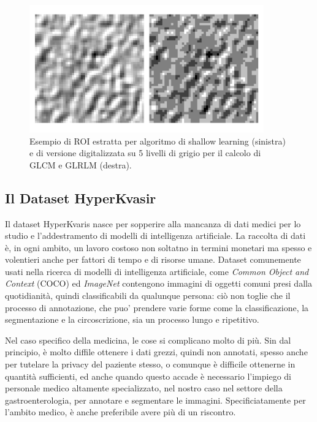 \begin{figure}
    \center
    \includegraphics[width=0.9\textwidth]{./assets/roi-shallow.png}
    \caption{\label{fig:roi-shallow} Esempio di ROI estratta per algoritmo di shallow learning (sinistra) e
    di versione digitalizzata su 5 livelli di grigio per il calcolo di GLCM e GLRLM (destra).}
\end{figure}

\subsection{Il Dataset HyperKvasir}

Il dataset HyperKvaris\cite{HyperKvasirDataset} nasce per sopperire
alla mancanza di dati medici per lo studio e l'addestramento
di modelli di intelligenza artificiale.
La raccolta di dati è, in ogni ambito, un lavoro costoso non 
soltatno in termini monetari ma spesso e volentieri anche
per fattori di tempo e di risorse umane.
Dataset comunemente usati nella ricerca di modelli di intelligenza
artificiale, come {\it Common Object and Context}\cite{cocodataset}
(COCO) ed {\it ImageNet} \cite{imagenet} contengono
immagini di oggetti comuni presi dalla quotidianità,
quindi classificabili da qualunque persona: ciò non toglie
che il processo di annotazione, che puo' prendere
varie forme come la classificazione, la segmentazione e la
circoscrizione, sia un processo lungo e ripetitivo.

Nel caso specifico della medicina, le cose si complicano
molto di più.
Sin dal principio, è molto diffile ottenere i dati grezzi,
quindi non annotati, spesso anche per tutelare la privacy
del paziente stesso, o comunque è difficile ottenerne in
quantità sufficienti, ed anche quando questo accade
è necessario l'impiego di personale medico altamente
specializzato, nel nostro caso nel settore della
gastroenterologia, per annotare e segmentare le immagini.
Specificiatamente per l'ambito medico, è anche preferibile
avere più di un riscontro.

